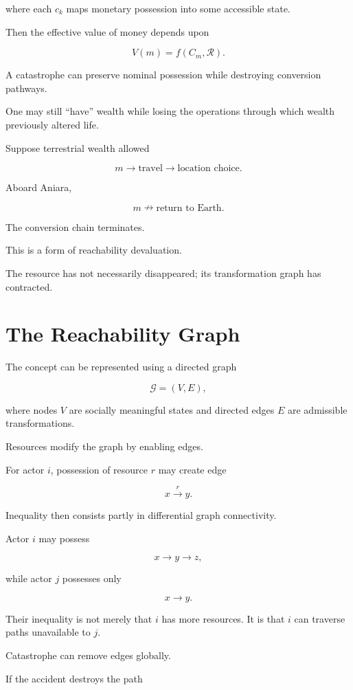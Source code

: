 \documentclass[11pt,oneside]{book}
\theoremstyle{definition}
\theoremstyle{remark}
\newcommand{\R}{\mathcal{R}}
\begin{document}
where each \(c_k\) maps monetary possession into some accessible state.

Then the effective value of money depends upon

\[
V(m)
=
f(C_m,\R).
\]

A catastrophe can preserve nominal possession while destroying conversion pathways.

One may still ``have'' wealth while losing the operations through which wealth previously altered life.

Suppose terrestrial wealth allowed

\[
m
\rightarrow
\text{travel}
\rightarrow
\text{location choice}.
\]

Aboard Aniara,

\[
m
\nrightarrow
\text{return to Earth}.
\]

The conversion chain terminates.

This is a form of reachability devaluation.

The resource has not necessarily disappeared; its transformation graph has contracted.

\section{The Reachability Graph}

The concept can be represented using a directed graph

\[
\mathcal G=(V,E),
\]

where nodes \(V\) are socially meaningful states and directed edges \(E\) are admissible transformations.

Resources modify the graph by enabling edges.

For actor \(i\), possession of resource \(r\) may create edge

\[
x\overset{r}{\longrightarrow}y.
\]

Inequality then consists partly in differential graph connectivity.

Actor \(i\) may possess

\[
x\rightarrow y\rightarrow z,
\]

while actor \(j\) possesses only

\[
x\rightarrow y.
\]

Their inequality is not merely that \(i\) has more resources. It is that \(i\) can traverse paths unavailable to \(j\).

Catastrophe can remove edges globally.

If the accident destroys the path
\end{document}
